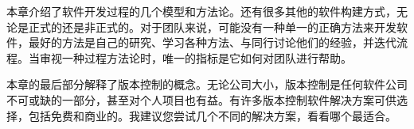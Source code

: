 本章介绍了软件开发过程的几个模型和方法论。还有很多其他的软件构建方式，无论是正式的还是非正式的。对于团队来说，可能没有一种单一的正确方法来开发软件，最好的方法是自己的研究、学习各种方法、与同行讨论他们的经验，并迭代流程。当审视一种过程方法论时，唯一的指标是它如何对团队进行帮助。

本章的最后部分解释了版本控制的概念。无论公司大小，版本控制是任何软件公司不可或缺的一部分，甚至对个人项目也有益。有许多版本控制软件解决方案可供选择，包括免费和商业的。我建议您尝试几个不同的解决方案，看看哪个最适合。